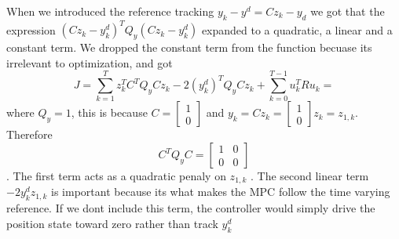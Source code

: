 \documentclass[12pt, onecolumn, a4paper]{exam}
\begin{document}
\begin{questions}
\begin{solution}
\begin{parts}
    When we introduced the reference tracking $ y_k - y^d = C z_k - y_d $ we got that the expression $ \left( C z_k - y_k^d \right)^T Q_y \left( C z_k - y_k^d \right)   $  expanded to a quadratic, a linear and a constant term. We dropped the constant term from the function becuase its irrelevant to optimization, and got 
    \[
        J = \sum_{ k=1 }^{ T } z_k^T C^T Q_y C z_k - 2 (y_k^d)^T Q_y C z_k + \sum_{ k=0 }^{ T-1 } u_k^T R u_k = 
    \]
    where $ Q_y = 1 $, this is because $ C = \begin{bmatrix}
        1\\ 0
    \end{bmatrix}  $ and $ y_k = Cz_k = \begin{bmatrix}
        1\\ 0
    \end{bmatrix} z_k =z_{1,k}  $. Therefore
    \[
        C^T Q_y C = \begin{bmatrix}
            1&0\\ 0&0
        \end{bmatrix} 
    \]. The first term acts as a quadratic penaly on $ z_{1,k} $ . The second linear term $ -2 y_k^d z_{1, k} $ is important because its what makes the MPC follow the time varying reference. If we dont include this term, the controller would simply drive the position state toward zero rather than track $ y_k^d $ 
     
     
    

  \end{parts}
\end{solution}

\end{questions}
\end{document}
